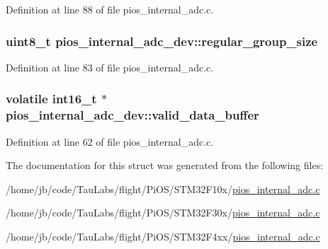 \-Definition at line 88 of file pios\-\_\-internal\-\_\-adc.\-c.

\hypertarget{structpios__internal__adc__dev_ab289592860ade289ca7d673ad17133e2}{
\subsubsection[{regular\-\_\-group\-\_\-size}]{\setlength{\rightskip}{0pt plus 5cm}uint8\-\_\-t {\bf pios\-\_\-internal\-\_\-adc\-\_\-dev\-::regular\-\_\-group\-\_\-size}}}\label{structpios__internal__adc__dev_ab289592860ade289ca7d673ad17133e2}


\-Definition at line 83 of file pios\-\_\-internal\-\_\-adc.\-c.

\hypertarget{structpios__internal__adc__dev_a40ef4dd9282a1f9fccabb559c52f3178}{
\subsubsection[{valid\-\_\-data\-\_\-buffer}]{\setlength{\rightskip}{0pt plus 5cm}volatile int16\-\_\-t $\ast$ {\bf pios\-\_\-internal\-\_\-adc\-\_\-dev\-::valid\-\_\-data\-\_\-buffer}}}\label{structpios__internal__adc__dev_a40ef4dd9282a1f9fccabb559c52f3178}


\-Definition at line 62 of file pios\-\_\-internal\-\_\-adc.\-c.



\-The documentation for this struct was generated from the following files\-:\begin{DoxyCompactItemize}
\item 
/home/jb/code/\-Tau\-Labs/flight/\-Pi\-O\-S/\-S\-T\-M32\-F10x/\hyperlink{_s_t_m32_f10x_2pios__internal__adc_8c}{pios\-\_\-internal\-\_\-adc.\-c}\item 
/home/jb/code/\-Tau\-Labs/flight/\-Pi\-O\-S/\-S\-T\-M32\-F30x/\hyperlink{_s_t_m32_f30x_2pios__internal__adc_8c}{pios\-\_\-internal\-\_\-adc.\-c}\item 
/home/jb/code/\-Tau\-Labs/flight/\-Pi\-O\-S/\-S\-T\-M32\-F4xx/\hyperlink{_s_t_m32_f4xx_2pios__internal__adc_8c}{pios\-\_\-internal\-\_\-adc.\-c}\end{DoxyCompactItemize}

